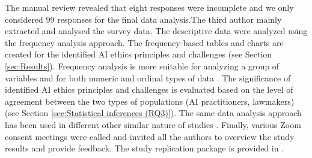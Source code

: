 The manual review revealed that eight responses were incomplete and we only considered 99 responses for the final data analysis.The third author mainly extracted and analysed the survey data. The descriptive data were analyzed using the frequency analysis approach. The frequency-based tables and charts are created for the identified AI ethics principles and challenges (see Section \ref{sec:Results}). Frequency analysis is more suitable for analyzing a group of variables and for both numeric and ordinal types of data \cite{bland2015introduction}. The significance of identified AI ethics principles and challenges is evaluated based on the level of agreement between the two types of populations (AI practitioners, lawmakers) (see Section \ref{sec:Statistical inferences (RQ3)}). The same data analysis approach has been used in different other similar nature of studies \cite{akbar2022srcmimm}\cite{khan2017systematic}\cite{niazi2016toward}. Finally, various Zoom consent meetings were called and invited all the authors to overview the study results and provide feedback. The study replication package is provided in \cite{replication}.



